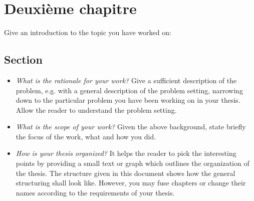\chapter{Deuxième chapitre}
Give an introduction to the topic you have worked on:
\section{Section}
\begin{itemize}
 \item \textit{What is the rationale for your work?} Give a sufficient description of the problem, e.g. with a general description of the problem setting, narrowing down to the particular problem you have been working on in your thesis. Allow the reader to understand the problem setting. 
 \item \textit{What is the scope of your work?} Given the above background, state briefly the focus of the work, what and how you did.
 \item \textit{How is your thesis organized?} It helps the reader to pick the interesting points by providing a small text or graph which outlines the organization of the thesis. The structure given in this document shows how the general structuring shall look like. However, you may fuse chapters or change their names according to the requirements of your thesis.
\end{itemize}
